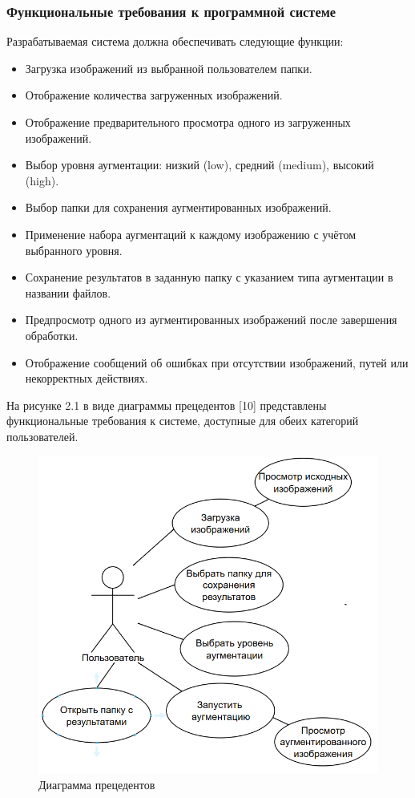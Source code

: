 \subsubsection{Функциональные требования к программной системе}

Разрабатываемая система должна обеспечивать следующие функции:

\begin{itemize}
	\item Загрузка изображений из выбранной пользователем папки.
	\item Отображение количества загруженных изображений.
	\item Отображение предварительного просмотра одного из загруженных изображений.
	\item Выбор уровня аугментации: низкий (low), средний (medium), высокий (high).
	\item Выбор папки для сохранения аугментированных изображений.
	\item Применение набора аугментаций к каждому изображению с учётом выбранного уровня.
	\item Сохранение результатов в заданную папку с указанием типа аугментации в названии файлов.
	\item Предпросмотр одного из аугментированных изображений после завершения обработки.
	\item Отображение сообщений об ошибках при отсутствии изображений, путей или некорректных действиях.
\end{itemize}

На рисунке 2.1 в виде диаграммы прецедентов [10] представлены функциональные требования к системе, доступные для обеих категорий пользователей.

\begin{figure}[H]
	\centering
	\includegraphics[width=0.7\linewidth]{images/diagrampreced}
	\caption{Диаграмма прецедентов}
	\label{fig:diagrampreced}
\end{figure}


